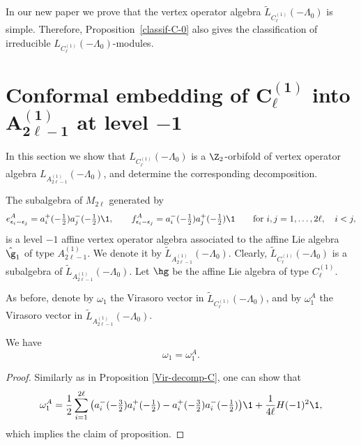 \documentclass[pdftex]{sigma}
\begin{document}
\begin{remark}
In our new paper \cite{AP-2012} we prove that the vertex operator
algebra $\widetilde{L}_{C_{\ell} ^{(1)} } (-\Lambda_0)$ is simple.
Therefore, Proposition~\ref{classif-C-0} also gives the
classif\/ication of irreducible $L_{C_{\ell} ^{(1)}
}(-\Lambda_0)$-modules.
\end{remark}



\section[Conformal embedding of $C_{\ell} ^{(1)}$ into $A_{2 \ell -1} ^{(1)}$ at level $-1$]{Conformal embedding of $\boldsymbol{C_{\ell} ^{(1)}}$ into $\boldsymbol{A_{2 \ell -1} ^{(1)}}$ at level $\boldsymbol{-1}$}

In this section we show that $L_{C_{\ell} ^{(1)}} (-\Lambda_0)$ is a
$\Z _2$-orbifold of vertex operator algebra $L_{A_{2 \ell -1}
^{(1)}} (-\Lambda_0)$, and determine the corresponding
decomposition.

The subalgebra of $M_{2 \ell}$ generated by
\begin{gather*}  e_{\epsilon _{i}- \epsilon _{j}}^{A} = a_i ^+
(-\tfrac{1}{2}) a_{j} ^-( -\tfrac{1}{2})
 {\1}, \qquad f_{\epsilon _{i}- \epsilon _{j}}^{A}=  a_i ^- (-\tfrac{1}{2}) a_{j} ^+( -\tfrac{1}{2})
 {\1}  \qquad   \mbox{for} \
  i,j =1, \dots, 2 \ell, \quad i<j,
\end{gather*}
is a level $-1$ af\/f\/ine vertex operator algebra associated to the
af\/f\/ine Lie algebra ${\hat \g_1}$ of type $A_{2 \ell -1}^{(1)}$. We
denote it by $\widetilde{L}_{A_{2 \ell -1} ^{(1)}} (-\Lambda_0)$.
Clearly, $\widetilde{L}_{C_{\ell} ^{(1)}} (-\Lambda_0)$ is a
subalgebra of $\widetilde{L}_{A_{2 \ell -1} ^{(1)}} (-\Lambda_0)$.
Let ${\hg}$ be the af\/f\/ine Lie algebra of type $C_{\ell} ^{(1)}$.

As before, denote by $ \omega_1$ the Virasoro vector in ${\widetilde
L}_{C_{\ell} ^{(1)}}(- \Lambda_0)$, and by $ \omega_1 ^A$ the
Virasoro vector in $\widetilde{L}_{A_{2 \ell -1} ^{(1)}}
(-\Lambda_0)$.

\begin{proposition} We have
\[ \omega_1 = \omega_1 ^A.\]
\end{proposition}

\begin{proof} Similarly as in Proposition \ref{Vir-decomp-C}, one can show that
\begin{gather*} \omega _{1}^A= \frac{1}{2} \sum_{i=1} ^{2 \ell} \big( a_i ^- (-
\tfrac{3}{2}) a_i ^{+} (-\tfrac{1}{2} ) -a_i ^+ (- \tfrac{3}{2}) a_i
^{-} (-\tfrac{1}{2} ) \big) {\1} + \frac{1}{4 \ell} H(-1) ^{2} {\1},
 \end{gather*}
 which implies the claim of proposition.
\end{proof}
\end{document}

